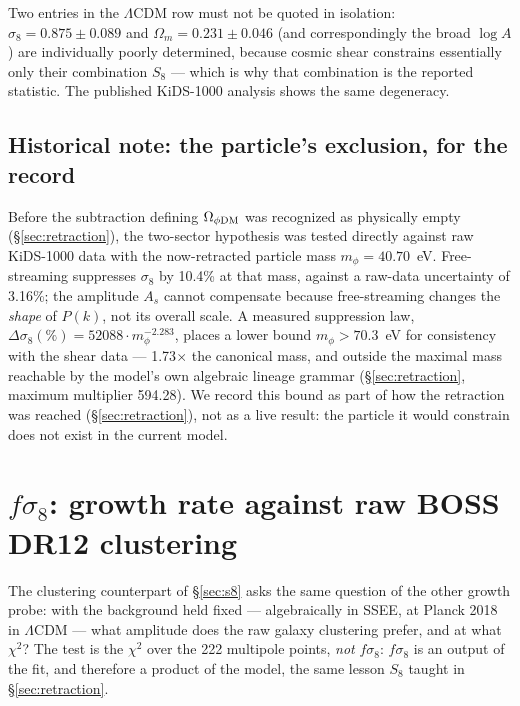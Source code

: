 \documentclass[12pt,a4paper]{article}
\newcommand{\SSEE}{\textsc{SSEE}}
\begin{document}
Two entries in the $\Lambda$CDM row must not be quoted in isolation:
$\sigma_8=0.875\pm0.089$ and $\Omega_m=0.231\pm0.046$ (and correspondingly the
broad $\log A$) are individually poorly determined, because cosmic shear
constrains essentially only their combination $S_8$ --- which is why that
combination is the reported statistic. The published KiDS-1000 analysis shows
the same degeneracy.

\subsection{Historical note: the particle's exclusion, for the record}

Before the subtraction defining $\Omega_{\phi\rm DM}$ was recognized as
physically empty (\S\ref{sec:retraction}), the two-sector hypothesis was
tested directly against raw KiDS-1000 data with the now-retracted particle mass
$m_\phi=40.70$~eV. Free-streaming suppresses $\sigma_8$ by 10.4\% at that
mass, against a raw-data uncertainty of 3.16\%; the amplitude $A_s$ cannot
compensate because free-streaming changes the \emph{shape} of $P(k)$, not its
overall scale. A measured suppression law,
$\Delta\sigma_8(\%)=52088\cdot m_\phi^{-2.283}$, places a lower bound
$m_\phi>70.3$~eV for consistency with the shear data --- 1.73$\times$ the
canonical mass, and outside the maximal mass reachable by the model's own
algebraic lineage grammar (§\ref{sec:retraction}, maximum multiplier 594.28).
We record this bound as part of how the retraction was reached
(\S\ref{sec:retraction}), not as a live result: the particle it would
constrain does not exist in the current model.

\section{$f\sigma_8$: growth rate against raw BOSS DR12 clustering}
\label{sec:fsigma8}

The clustering counterpart of \S\ref{sec:s8} asks the same question of the
other growth probe: with the background held fixed --- algebraically in
\SSEE{}, at Planck 2018 in $\Lambda$CDM --- what amplitude does the raw
galaxy clustering prefer, and at what $\chi^2$? The test is the $\chi^2$ over
the 222 multipole points, \emph{not} $f\sigma_8$: $f\sigma_8$ is an output of
the fit, and therefore a product of the model, the same lesson $S_8$ taught in
\S\ref{sec:retraction}.
\end{document}
